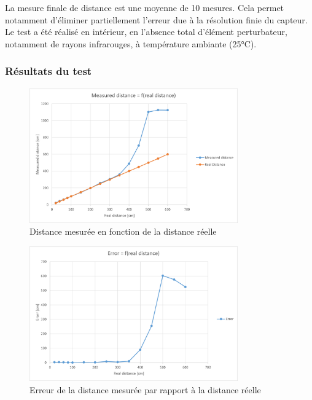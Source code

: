 La mesure finale de distance est une moyenne de 10 mesures. Cela permet notamment d'éliminer partiellement
l'erreur due à la résolution finie du capteur.\\
Le test a été réalisé en intérieur, en l'absence total d'élément perturbateur, notamment de rayons 
infrarouges, à température ambiante (25°C).

\subsubsection{Résultats du test}

\begin{figure}[H]
    \centering
    \includegraphics[width=0.8\textwidth]{Images/LiDAR/LiDARRealDistanceGraph_MesDist.png}
    \caption{Distance mesurée en fonction de la distance réelle}
    \label{RealDistanceMesGraph}
\end{figure}

\begin{figure}[H]
    \centering
    \includegraphics[width=0.8\textwidth]{Images/LiDAR/LiDARRealDistanceGraph_MesDistError.png}
    \caption{Erreur de la distance mesurée par rapport à la distance réelle}
    \label{RealDistanceMesGraphError}
\end{figure}

